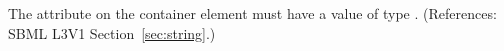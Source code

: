 The attribute  on the  container element
must have a value of type .  (References: SBML
L3V1 Section~\ref{sec:string}.)
